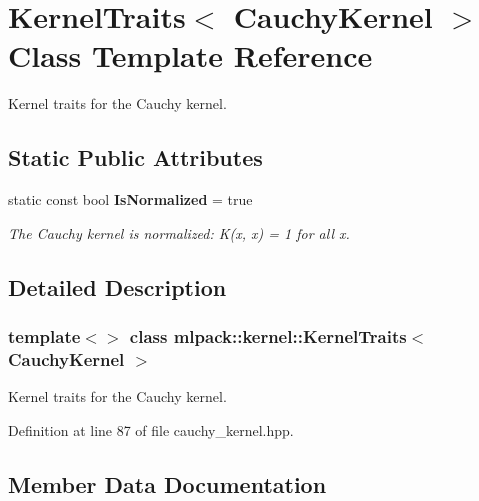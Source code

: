 \section{Kernel\+Traits$<$ Cauchy\+Kernel $>$ Class Template Reference}
\label{classmlpack_1_1kernel_1_1KernelTraits_3_01CauchyKernel_01_4}


Kernel traits for the Cauchy kernel.  


\subsection*{Static Public Attributes}
\begin{DoxyCompactItemize}
\item 
static const bool \textbf{ Is\+Normalized} = true
\begin{DoxyCompactList}\small\item\em The Cauchy kernel is normalized\+: K(x, x) = 1 for all x. \end{DoxyCompactList}\end{DoxyCompactItemize}


\subsection{Detailed Description}
\subsubsection*{template$<$$>$\newline
class mlpack\+::kernel\+::\+Kernel\+Traits$<$ Cauchy\+Kernel $>$}

Kernel traits for the Cauchy kernel. 

Definition at line 87 of file cauchy\+\_\+kernel.\+hpp.



\subsection{Member Data Documentation}
\mbox{\label{classmlpack_1_1kernel_1_1KernelTraits_3_01CauchyKernel_01_4_a213c74e1e7c01890b64c8b9e88f8c0dc}} 
